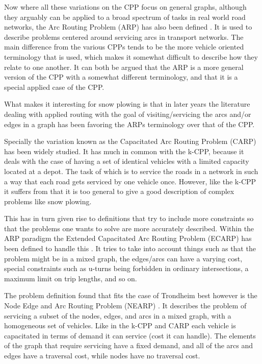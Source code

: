 Now where all these variations on the CPP focus on general graphs, although they arguably can be applied to a broad spectrum of tasks in real world road networks, the Arc Routing Problem (ARP) has also been defined \citep{eiselt1995ARP}. It is used to describe problems centered around servicing arcs in transport networks. The main difference from the various CPPs tends to be the more vehicle oriented terminology that is used, which makes it somewhat difficult to describe how they relate to one another. It can both be argued that the ARP is a more general version of the CPP with a somewhat different terminology, and that it is a special applied case of the CPP.

What makes it interesting for snow plowing is that in later years the literature dealing with applied routing with the goal of visiting/servicing the arcs and/or edges in a graph has been favoring the ARPs terminology over that of the CPP.

Specially the variation known as the Capacitated Arc Routing Problem (CARP) \citep{ulusoy1985CARP} has been widely studied. It has much in common with the k-CPP, because it deals with the case of having a set of identical vehicles with a limited capacity located at a depot. The task of which is to service the roads in a network in such a way that each road gets serviced by one vehicle once. However, like the k-CPP it suffers from that it is too general to give a good description of complex problems like snow plowing.

This has in turn given rise to definitions that try to include more constraints so that the problems one wants to solve are more accurately described. Within the ARP paradigm the Extended Capacitated Arc Routing Problem (ECARP) has been defined to handle this \citep{lacomme2004competitiveMA}. It tries to take into account things such as that the problem might be in a mixed graph, the edges/arcs can have a varying cost, special constraints such as u-turns being forbidden in ordinary intersections, a maximum limit on trip lengths, and so on.

The problem definition found that fits the case of Trondheim best however is the Node Edge and Arc Routing Problem (NEARP) \citep{prins2005NEARP}. It describes the problem of servicing a subset of the nodes, edges, and arcs in a mixed graph, with a homogeneous set of vehicles. Like in the k-CPP and CARP each vehicle is capacitated in terms of demand it can service (cost it can handle). The elements of the graph that require servicing have a fixed demand, and all of the arcs and edges have a traversal cost, while nodes have no traversal cost.

